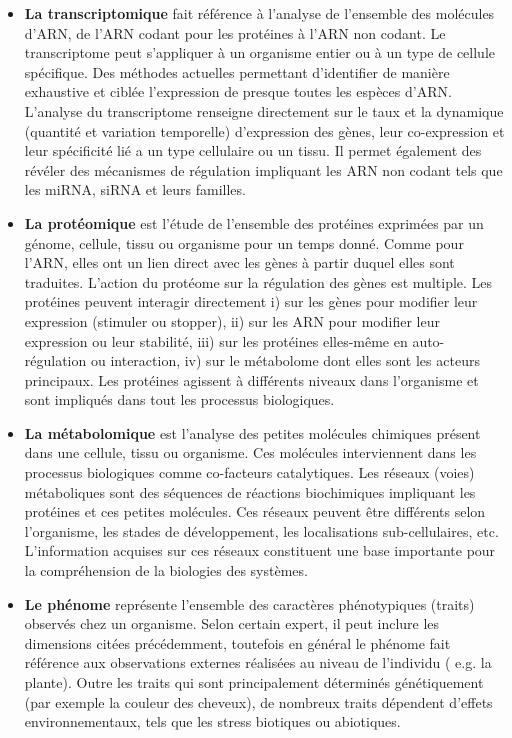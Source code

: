 \begin{itemize}
    \item \textbf{La transcriptomique} fait référence à l'analyse de l'ensemble des molécules d'ARN, de l'ARN codant pour les protéines à l'ARN non codant. Le transcriptome peut s’appliquer à un organisme entier ou à un type de cellule spécifique. Des méthodes actuelles permettant d'identifier de manière exhaustive et ciblée l'expression de presque toutes les espèces d'ARN. L'analyse du transcriptome renseigne directement sur le taux et la dynamique (quantité et variation temporelle) d'expression des gènes, leur co-expression et leur spécificité lié a un type cellulaire ou un tissu. Il permet également des révéler des mécanismes de régulation impliquant les ARN non codant tels que les miRNA, siRNA et leurs familles.  \\
    
    \item \textbf{La protéomique} est l'étude de l'ensemble des protéines exprimées par un génome, cellule, tissu ou organisme pour un temps donné. Comme pour l'ARN, elles ont un lien direct avec les gènes à partir duquel elles sont traduites. L'action du protéome sur la régulation des gènes est multiple. Les protéines peuvent interagir directement i)  sur les gènes pour modifier leur expression (stimuler ou stopper), ii) sur les ARN pour modifier leur expression ou leur stabilité, iii) sur les protéines elles-même en auto-régulation ou interaction, iv) sur le métabolome dont elles sont les acteurs principaux. Les protéines agissent à différents niveaux dans l'organisme et sont impliqués dans tout les processus biologiques.  \\
    
    \item \textbf{La métabolomique} est l'analyse des petites molécules chimiques présent dans une cellule, tissu ou organisme. Ces molécules interviennent dans les processus biologiques comme co-facteurs catalytiques. Les réseaux (voies) métaboliques sont des séquences de réactions biochimiques impliquant les protéines et ces petites molécules. Ces réseaux peuvent être différents selon l'organisme, les stades de développement, les localisations sub-cellulaires, etc. L'information acquises sur ces réseaux constituent une base importante pour la compréhension de la biologies des systèmes.
    \item \textbf{Le phénome} représente l'ensemble des caractères phénotypiques (traits) observés chez un organisme. Selon certain expert, il peut inclure les dimensions citées précédemment, toutefois en général le phénome fait référence aux observations externes réalisées au niveau de l'individu ( e.g. la plante). Outre les traits qui sont principalement déterminés génétiquement (par exemple la couleur des cheveux), de nombreux traits dépendent d'effets environnementaux, tels que les stress biotiques ou abiotiques.\\
\end{itemize}


